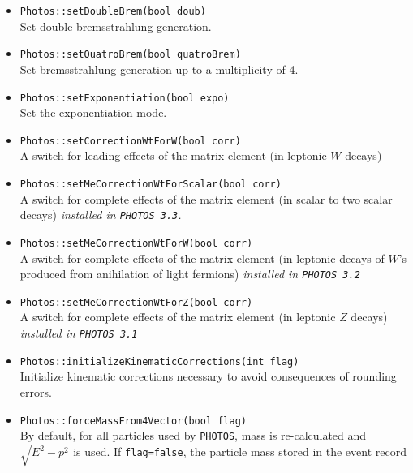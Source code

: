 \documentclass[]{Photos_interface_design}
\begin{document}
\begin{itemize}
  \item {\tt Photos::setDoubleBrem(bool doub)} \\
        Set double bremsstrahlung generation.
  \item {\tt Photos::setQuatroBrem(bool quatroBrem)} \\
        Set bremsstrahlung generation up to a multiplicity of 4.
  \item {\tt Photos::setExponentiation(bool expo)} \\
        Set the exponentiation mode.
  \item {\tt Photos::setCorrectionWtForW(bool corr)} \\
         A switch for leading effects of the matrix element (in leptonic $W$ decays)
  \item {\tt Photos::setMeCorrectionWtForScalar(bool corr)} \\
         A switch for complete effects of the matrix element (in scalar to two scalar decays) {\it  installed in {\tt PHOTOS 3.3}.}
  \item {\tt Photos::setMeCorrectionWtForW(bool corr)} \\
         A switch for complete effects of the matrix element (in leptonic decays of $W$'s produced from anihilation of light fermions) {\it  installed in {\tt PHOTOS 3.2} }
  \item {\tt Photos::setMeCorrectionWtForZ(bool corr)} \\
         A switch for complete effects of the matrix element (in leptonic $Z$ decays) {\it  installed in {\tt PHOTOS 3.1} }
  \item {\tt Photos::initializeKinematicCorrections(int flag)} \\
        Initialize kinematic corrections necessary to avoid consequences of rounding errors.
  \item {\tt Photos::forceMassFrom4Vector(bool flag)}  \\
        By default, for all particles used by {\tt PHOTOS}, 
        mass is re-calculated and $\sqrt{E^2-p^2}$ is used. 
        If {\tt flag=false}, the particle mass stored in the  event record 

\end{itemize}
\end{document}

